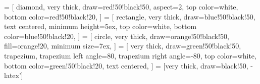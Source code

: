  = [
  diamond,
  very thick,
  draw=red!50!black!50,
  aspect=2,
  top color=white,
  bottom color=red!50!black!20,
]
 = [
  rectangle,
  very thick,
  draw=blue!50!black!50,
  text centered,
  minimum height=5ex,
  top color=white,
  bottom color=blue!50!black!20,
]
 = [
  circle,
  very thick,
  draw=orange!50!black!50,
  fill=orange!20,
  minimum size=7ex,
]
 = [
  very thick,
  draw=green!50!black!50,
  trapezium,
  trapezium left angle=80,
  trapezium right angle=-80,
  top color=white,
  bottom color=green!50!black!20,
  text centered,
]
 = [very thick, draw=black!50, -latex']

